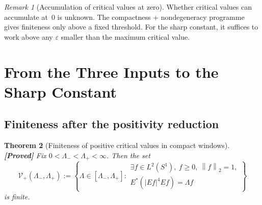 \documentclass[12pt]{article}
\newtheorem{theorem}{Theorem}[section]
\theoremstyle{definition}
\theoremstyle{remark}
\newtheorem{remark}[theorem]{Remark}
\newcommand{\norm}[1]{\left\|#1\right\|}
\newcommand{\proven}{\textbf{\color{teal}[Proved]}}
\begin{document}
\begin{remark}[Accumulation of critical values at zero]
  \label{rem:accumulation}
  Whether critical values can accumulate at~$0$ is unknown.  The
  compactness + nondegeneracy programme gives finiteness only
  above a fixed threshold.  For the sharp constant, it suffices to
  work above any $\varepsilon$ smaller than the maximum critical
  value.
\end{remark}

\section{From the Three Inputs to the Sharp Constant}
\label{sec:finiteness}

\subsection{Finiteness after the positivity reduction}

\begin{theorem}[Finiteness of positive critical values in compact windows]
  \label{thm:positive-values-finite}
  \proven\quad
  Fix $0<\Lambda_-<\Lambda_+<\infty$.  Then the set
  \[
    \mathcal V_+(\Lambda_-,\Lambda_+)
    :=
    \left\{
      \Lambda\in[\Lambda_-,\Lambda_+]:
      \begin{array}{l}
      \exists f\in L^2(S^1),\ f\geq 0,\ \norm{f}_2=1,\\
      E^*(|Ef|^4Ef)=\Lambda f
      \end{array}
    \right\}
  \]
  is finite.
\end{theorem}
\end{document}
